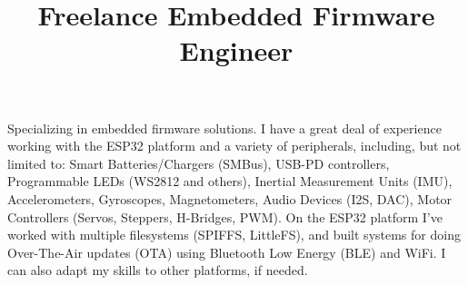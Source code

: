 \title{\textbf{Freelance Embedded Firmware Engineer}}
\begin{position}
Specializing in embedded firmware solutions. I have a great deal of
 experience working with the ESP32 platform and a variety of
 peripherals, including, but not limited to: Smart Batteries/Chargers
 (SMBus), USB-PD controllers, Programmable LEDs (WS2812 and others),
 Inertial Measurement Units (IMU), Accelerometers, Gyroscopes,
 Magnetometers, Audio Devices (I2S, DAC), Motor Controllers (Servos,
 Steppers, H-Bridges, PWM). On the ESP32 platform I've worked with
 multiple filesystems (SPIFFS, LittleFS), and built systems for doing
 Over-The-Air updates (OTA) using Bluetooth Low Energy (BLE) and WiFi.
 I can also adapt my skills to other platforms, if needed.
\end{position}
